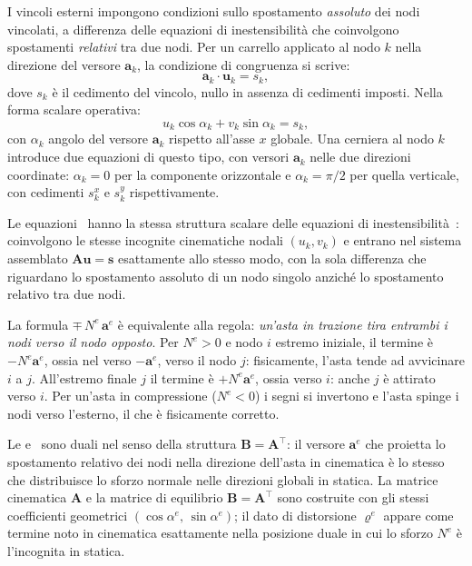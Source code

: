 I vincoli esterni impongono condizioni sullo spostamento
\emph{assoluto} dei nodi vincolati, a differenza delle
equazioni di inestensibilità che coinvolgono spostamenti
\emph{relativi} tra due nodi. Per un carrello applicato
al nodo $k$ nella direzione del versore $\mathbf{a}_k$,
la condizione di congruenza si scrive:
\begin{equation}\label{eq:vincolo_esterno}
	\mathbf{a}_k \cdot \mathbf{u}_k = s_k,
\end{equation}
dove $s_k$ è il cedimento del vincolo, nullo in assenza
di cedimenti imposti. Nella forma scalare operativa:
\begin{equation}\label{eq:vincolo_esterno_scalare}
	u_k \cos\alpha_k + v_k \sin\alpha_k = s_k,
\end{equation}
con $\alpha_k$ angolo del versore $\mathbf{a}_k$ rispetto
all'asse $x$ globale. Una cerniera al nodo $k$ introduce
due equazioni di questo tipo, con versori $\mathbf{a}_k$
nelle due direzioni coordinate: $\alpha_k = 0$ per la
componente orizzontale e $\alpha_k = \pi/2$ per quella
verticale, con cedimenti $s_k^x$ e $s_k^y$ rispettivamente.

Le equazioni~ hanno
la stessa struttura scalare delle equazioni di
inestensibilità~: coinvolgono
le stesse incognite cinematiche nodali $(u_k, v_k)$ e
entrano nel sistema assemblato $\bm{A}\bm{u} = \bm{s}$
esattamente allo stesso modo, con la sola differenza
che riguardano lo spostamento assoluto di un nodo
singolo anziché lo spostamento relativo tra due nodi.



\begin{oss}
	La formula $\mp\, N^e\, \mathbf{a}^e$ è equivalente
	alla regola: \emph{un'asta in trazione tira entrambi
		i nodi verso il nodo opposto}. Per $N^e > 0$ e nodo
	$i$ estremo iniziale, il termine è $-N^e\mathbf{a}^e$,
	ossia nel verso $-\mathbf{a}^e$, verso il nodo $j$:
	fisicamente, l'asta tende ad avvicinare $i$ a $j$.
	All'estremo finale $j$ il termine è $+N^e\mathbf{a}^e$,
	ossia verso $i$: anche $j$ è attirato verso $i$.
	Per un'asta in compressione ($N^e < 0$) i segni
	si invertono e l'asta spinge i nodi verso l'esterno,
	il che è fisicamente corretto.
\end{oss}

\begin{oss}[Dualità cinematica--statica:
	$\bm{B} = \bm{A}^\top$]
	Le 
	e~ sono duali nel
	senso della struttura $\bm{B} = \bm{A}^\top$:
	il versore $\bm{a}^e$ che proietta lo spostamento
	relativo dei nodi nella direzione dell'asta in
	cinematica è lo stesso che distribuisce lo sforzo
	normale nelle direzioni globali in statica.
	La matrice cinematica $\bm{A}$ e la matrice di
	equilibrio $\bm{B} = \bm{A}^\top$ sono costruite
	con gli stessi coefficienti geometrici
	$(\cos\alpha^e,\, \sin\alpha^e)$; il dato di
	distorsione $\varrho^e$ appare come termine noto
	in cinematica esattamente nella posizione duale in
	cui lo sforzo $N^e$ è l'incognita in statica.
\end{oss}



